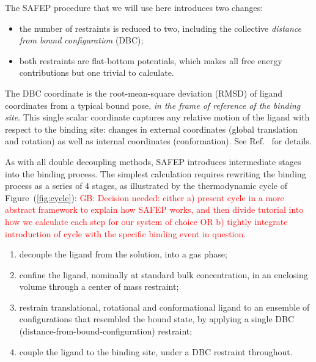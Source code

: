 \documentclass[9pt,tutorial]{livecoms}
\newcommand{\grace}[1]{\textcolor{red}{GB: #1}}
\begin{document}
The SAFEP procedure that we will use here introduces two changes:\cite{Salari2018}
\begin{itemize}
    \item the number of restraints is reduced to two, including the collective \textit{distance from bound configuration} (DBC);
    \item both restraints are flat-bottom potentials, which makes all free energy contributions but one trivial to calculate.
\end{itemize}

The DBC coordinate is the root-mean-square deviation (RMSD) of ligand coordinates from a typical bound pose, \textit{in the frame of reference of the binding site}.
This single scalar coordinate captures any relative motion of the ligand with respect to the binding site: changes in external coordinates (global translation and rotation) as well as internal coordinates (conformation).
See Ref.~ for details.

As with all double decoupling methods, SAFEP introduces intermediate stages into the binding process. The simplest calculation requires rewriting the binding process as a series of 4 stages, as illustrated by the thermodynamic cycle of Figure~(\ref{fig:cycle}):
\grace{Decision needed: either a) present cycle in a more abstract framework to explain how SAFEP works,  and then divide tutorial into how we calculate each step for our system of choice OR b) tightly integrate introduction of cycle with the specific binding event in question.}  
\begin{enumerate}
    \item decouple the ligand from the solution, into a gas phase;
    \item confine the ligand, nominally at standard bulk concentration, in an enclosing volume through a center of mass restraint;
    \item restrain translational, rotational and conformational ligand to an ensemble of configurations that resembled the bound state, by applying a single DBC (distance-from-bound-configuration) restraint;
    \item couple the ligand to the binding site, under a DBC restraint throughout.
\end{enumerate}
\end{document}
